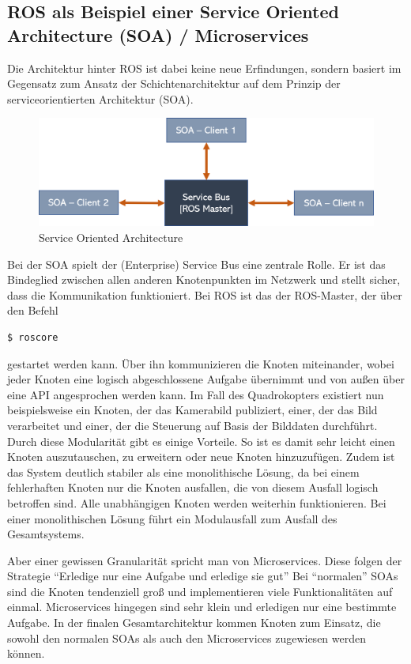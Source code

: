 \subsection{ROS als Beispiel einer Service Oriented Architecture (SOA) / Microservices}
Die Architektur hinter ROS ist dabei keine neue Erfindungen, sondern basiert im Gegensatz zum Ansatz der Schichtenarchitektur auf dem Prinzip der serviceorientierten Architektur (SOA). 
\begin{figure}[h]
	\centering
	\includegraphics[scale=0.5]{"Grafiken/soa.png"}
	\caption{Service Oriented Architecture}
	\label{fig:meine-grafik}
\end{figure}
Bei der SOA spielt der (Enterprise) Service Bus eine zentrale Rolle. Er ist das Bindeglied zwischen allen anderen Knotenpunkten im Netzwerk und stellt sicher, dass die Kommunikation funktioniert. Bei ROS ist das der ROS-Master, der über den Befehl 
\begin{lstlisting}[language=bash]
$ roscore
\end{lstlisting}
gestartet werden kann. Über ihn kommunizieren die Knoten miteinander, wobei jeder Knoten eine logisch abgeschlossene Aufgabe übernimmt und von außen über eine API angesprochen werden kann. Im Fall des Quadrokopters existiert nun beispielsweise ein Knoten, der das Kamerabild publiziert, einer, der das Bild verarbeitet und einer, der die Steuerung auf Basis der Bilddaten durchführt. Durch diese Modularität gibt es einige Vorteile. So ist es damit sehr leicht einen Knoten auszutauschen, zu erweitern oder neue Knoten hinzuzufügen. Zudem ist das System deutlich stabiler als eine monolithische Lösung, da bei einem fehlerhaften Knoten nur die Knoten ausfallen, die von diesem Ausfall logisch betroffen sind. Alle unabhängigen Knoten werden weiterhin funktionieren. Bei einer monolithischen Lösung führt ein Modulausfall zum Ausfall des Gesamtsystems. 

Aber einer gewissen Granularität spricht man von Microservices. Diese folgen der Strategie 
``Erledige nur eine Aufgabe und erledige sie gut'' %
Bei ``normalen'' SOAs sind die Knoten tendenziell groß und implementieren viele Funktionalitäten auf einmal. Microservices hingegen sind sehr klein und erledigen nur eine bestimmte Aufgabe. In der finalen Gesamtarchitektur kommen Knoten zum Einsatz, die sowohl den normalen SOAs als auch den Microservices zugewiesen werden können.

